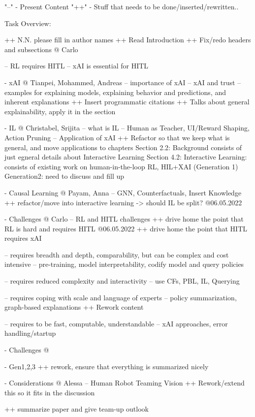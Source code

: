"--" - Present Content
"++" - Stuff that needs to be done/inserted/rewritten..


Task Overview:

++ N.N. please fill in author names
++ Read Introduction
++ Fix/redo headers and subsections @ Carlo

-- RL requires HITL
-- xAI is essential for HITL

- xAI @ Tianpei, Mohammed, Andreas
-- importance of xAI
-- xAI and trust 
-- examples for explaining models, explaining behavior and predictions, and inherent explanations
++ Insert programmatic citations
++ Talks about general explainability, apply it in the section

- IL @ Christabel, Srijita
-- what is IL
-- Human as Teacher, UI/Reward Shaping, Action Pruning
-- Application of xAI
++ Refactor so that we keep what is general, and move applications to chapters
    Section 2.2: Background consists of just egneral details about Interactive Learning
    Section 4.2: Interactive Learning: consists of existing work on human-in-the-loop RL, HIL+XAI (Generation 1)
    Generation2: need to discuss and fill up

- Causal Learning @ Payam, Anna
-- GNN, Counterfactuals, Insert Knowledge
++ refactor/move into interactive learning -> should IL be split? @06.05.2022

- Challenges @ Carlo
-- RL and HITL challenges
++ drive home the point that RL is hard and requires HITL @06.05.2022
++ drive home the point that HITL requires xAI


-- requires breadth and depth, comparability, but can be complex and cost intensive
-- pre-training, model interpretability, codify model and query policies

-- requires reduced complexity and interactivity
-- use CFs, PBL, IL, Querying

-- requires coping with scale and language of experts
-- policy summarization, graph-based explanations
++ Rework content

-- requires to be fast, computable, understandable
-- xAI approaches, error handling/startup

- Challenges @ 

- Gen1,2,3
++ rework, ensure that everything is summarized nicely

- Considerations @ Alessa
-- Human Robot Teaming Vision
++ Rework/extend this so it fits in the discussion

++ summarize paper and give team-up outlook